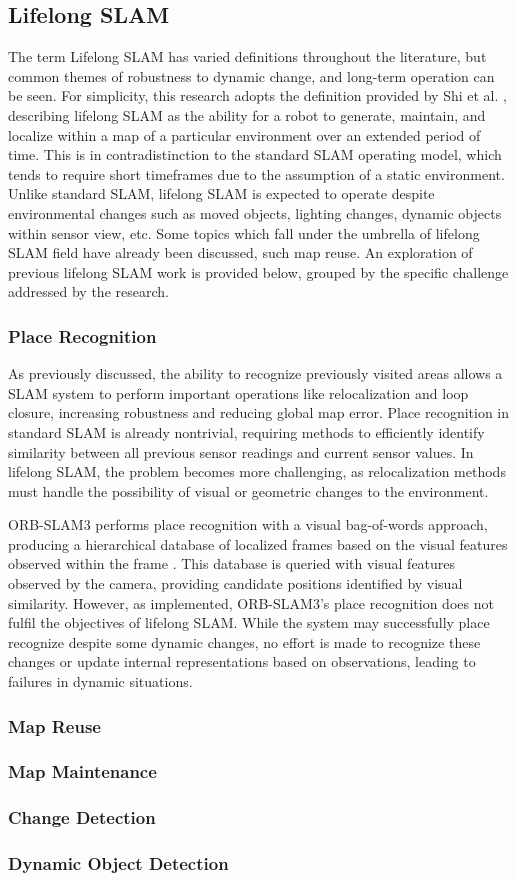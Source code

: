 \subsection{Lifelong SLAM}

The term Lifelong SLAM has varied definitions throughout the literature, but common themes of robustness to dynamic change, and long-term operation can be seen. For simplicity, this research adopts the definition provided by Shi et al. \cite{shiAreWeReady2020}, describing lifelong SLAM as the ability for a robot to generate, maintain, and localize within a map of a particular environment over an extended period of time. This is in contradistinction to the standard SLAM operating model, which tends to require short timeframes due to the assumption of a static environment. Unlike standard SLAM, lifelong SLAM is expected to operate despite environmental changes such as moved objects, lighting changes, dynamic objects within sensor view, etc. Some topics which fall under the umbrella of lifelong SLAM field have already been discussed, such map reuse. An exploration of previous lifelong SLAM work is provided below, grouped by the specific challenge addressed by the research.

\subsubsection{Place Recognition}

As previously discussed, the ability to recognize previously visited areas allows a SLAM system to perform important operations like relocalization and loop closure, increasing robustness and reducing global map error. Place recognition in standard SLAM is already nontrivial, requiring methods to efficiently identify similarity between all previous sensor readings and current sensor values. In lifelong SLAM, the problem becomes more challenging, as relocalization methods must handle the possibility of visual or geometric changes to the environment.

ORB-SLAM3 performs place recognition with a visual bag-of-words approach, producing a hierarchical database of localized frames based on the visual features observed within the frame \cite{camposORBSLAM3AccurateOpenSource2021}\cite{galvez-lopezBagsBinaryWords2012}. This database is queried with visual features observed by the camera, providing candidate positions identified by visual similarity. However, as implemented, ORB-SLAM3's place recognition does not fulfil the objectives of lifelong SLAM. While the system may successfully place recognize despite some dynamic changes, no effort is made to recognize these changes or update internal representations based on observations, leading to failures in dynamic situations.



\subsubsection{Map Reuse}
\subsubsection{Map Maintenance}
\subsubsection{Change Detection}
\subsubsection{Dynamic Object Detection}
